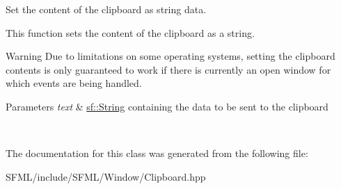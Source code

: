 Set the content of the clipboard as string data. 

This function sets the content of the clipboard as a string.

\begin{DoxyWarning}{Warning}
Due to limitations on some operating systems, setting the clipboard contents is only guaranteed to work if there is currently an open window for which events are being handled.
\end{DoxyWarning}

\begin{DoxyParams}{Parameters}
{\em text} & \mbox{\hyperlink{classsf_1_1_string}{sf\+::\+String}} containing the data to be sent to the clipboard \begin{DoxyVerb}\end{DoxyVerb}
 \\
\hline
\end{DoxyParams}


The documentation for this class was generated from the following file\+:\begin{DoxyCompactItemize}
\item 
S\+F\+M\+L/include/\+S\+F\+M\+L/\+Window/Clipboard.\+hpp\end{DoxyCompactItemize}
